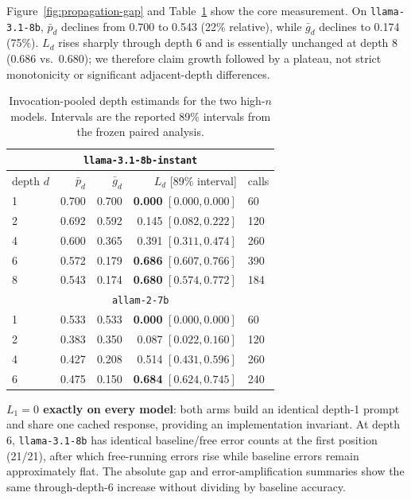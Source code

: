 \documentclass{article}
\begin{document}
Figure~\ref{fig:propagation-gap} and Table~\ref{tab:depth-results} show the core measurement. On \texttt{llama-3.1-8b}, $\bar p_d$ declines from 0.700 to 0.543 (22\% relative), while $\bar g_d$ declines to 0.174 (75\%). $L_d$ rises sharply through depth 6 and is essentially unchanged at depth 8 (0.686 vs.\ 0.680); we therefore claim growth followed by a plateau, not strict monotonicity or significant adjacent-depth differences.

\begin{table}[h]
\centering
\caption{Invocation-pooled depth estimands for the two high-$n$ models. Intervals are the reported 89\% intervals from the frozen paired analysis.}
\label{tab:depth-results}
\footnotesize
\begin{tabular}{@{}lrrrl@{}}
\toprule
\multicolumn{5}{c}{\texttt{llama-3.1-8b-instant}} \\
\midrule
depth $d$ & $\bar p_d$ & $\bar g_d$ & $L_d$ [89\% interval] & calls \\
\midrule
1 & 0.700 & 0.700 & \textbf{0.000} $[0.000,0.000]$ & 60 \\
2 & 0.692 & 0.592 & 0.145 $[0.082,0.222]$ & 120 \\
4 & 0.600 & 0.365 & 0.391 $[0.311,0.474]$ & 260 \\
6 & 0.572 & 0.179 & \textbf{0.686} $[0.607,0.766]$ & 390 \\
8 & 0.543 & 0.174 & \textbf{0.680} $[0.574,0.772]$ & 184 \\
\midrule
\multicolumn{5}{c}{\texttt{allam-2-7b}} \\
\midrule
1 & 0.533 & 0.533 & \textbf{0.000} $[0.000,0.000]$ & 60 \\
2 & 0.383 & 0.350 & 0.087 $[0.022,0.160]$ & 120 \\
4 & 0.427 & 0.208 & 0.514 $[0.431,0.596]$ & 260 \\
6 & 0.475 & 0.150 & \textbf{0.684} $[0.624,0.745]$ & 240 \\
\bottomrule
\end{tabular}
\end{table}

\textbf{$L_1=0$ exactly on every model}: both arms build an identical depth-1 prompt and share one cached response, providing an implementation invariant. At depth 6, \texttt{llama-3.1-8b} has identical baseline/free error counts at the first position (21/21), after which free-running errors rise while baseline errors remain approximately flat. The absolute gap and error-amplification summaries show the same through-depth-6 increase without dividing by baseline accuracy.
\end{document}
